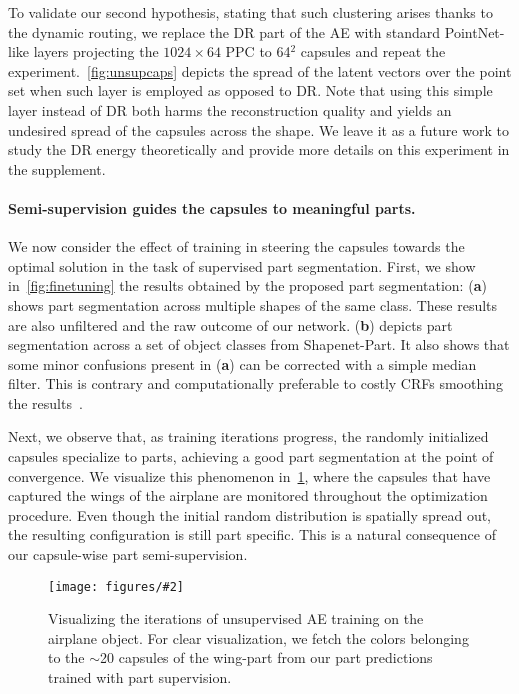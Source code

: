 \documentclass[10pt,twocolumn,letterpaper]{article}
\theoremstyle{break}
\newcommand{\insertimageC}[5]{ \begin{figure}[#5]
\centering
\texttt{[image: figures/\#2]}
\caption{#3}
\label{#4}
\end{figure}
}
\begin{document}
To validate our second hypothesis, stating that such clustering arises thanks to the dynamic routing, we replace the DR part of the AE with standard PointNet-like layers projecting the $1024\times 64$ PPC to 64$^2$ capsules and repeat the experiment.~\cref{fig:unsupcaps} depicts the spread of the latent vectors over the point set when such layer is employed as opposed to DR. Note that using this simple layer instead of DR both harms the reconstruction quality and yields an undesired spread of the capsules across the shape. We leave it as a future work to study the DR energy theoretically and provide more details on this experiment in the supplement.








\vspace{-3mm}
\paragraph{Semi-supervision guides the capsules to meaningful parts.}
We now consider the effect of training in steering the capsules towards the optimal solution in the task of supervised part segmentation. First, we show in~\cref{fig:finetuning} the results obtained by the proposed part segmentation: (\textbf{a}) shows part segmentation across multiple shapes of the same class. These results are also unfiltered and the raw outcome of our network. (\textbf{b}) depicts part segmentation across a set of object classes from Shapenet-Part. It also shows that some minor confusions present in (\textbf{a}) can be corrected with a simple median filter. This is contrary and computationally preferable to costly CRFs smoothing the results~\cite{wang2017cnn}. 

Next, we observe that, as training iterations progress, the randomly initialized capsules specialize to parts, achieving a good part segmentation at the point of convergence. We visualize this phenomenon in~\cref{fig:evolution}, where the capsules that have captured the wings of the airplane are monitored throughout the optimization procedure. Even though the initial random distribution is spatially spread out, the resulting configuration is still part specific. This is a natural consequence of our capsule-wise part semi-supervision. 

\insertimageC{1}{model_evolution.pdf}{Visualizing the iterations of unsupervised AE training on the airplane object. For clear visualization, we fetch the colors belonging to the $\sim$20 capsules of the wing-part from our part predictions trained with part supervision.\vspace{-3mm}}{fig:evolution}{t!}
\vspace{-2mm}
\end{document}
